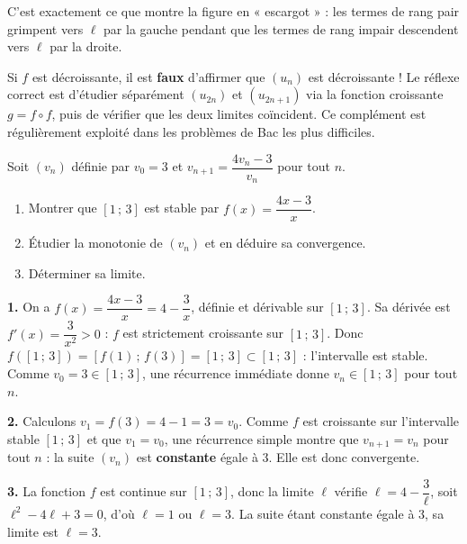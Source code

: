 \documentclass[11pt]{article}
\begin{document}
C'est exactement ce que montre la figure en « escargot » : les termes de rang pair grimpent vers $\ell$ par la gauche pendant que les termes de rang impair descendent vers $\ell$ par la droite.

\begin{attention}
Si $f$ est décroissante, il est \textbf{faux} d'affirmer que $(u_n)$ est décroissante ! Le réflexe correct est d'étudier séparément $(u_{2n})$ et $(u_{2n+1})$ via la fonction croissante $g = f \circ f$, puis de vérifier que les deux limites coïncident. Ce complément est régulièrement exploité dans les problèmes de Bac les plus difficiles.
\end{attention}

\begin{exercice}
Soit $(v_n)$ définie par $v_0 = 3$ et $v_{n+1} = \dfrac{4 v_n - 3}{v_n}$ pour tout $n$.
\begin{enumerate}
\item Montrer que $[1\,;\,3]$ est stable par $f(x) = \dfrac{4x-3}{x}$.
\item Étudier la monotonie de $(v_n)$ et en déduire sa convergence.
\item Déterminer sa limite.
\end{enumerate}
\end{exercice}

\begin{corrige}[Exercice]
\textbf{1.} On a $f(x) = \dfrac{4x-3}{x} = 4 - \dfrac{3}{x}$, définie et dérivable sur $[1\,;\,3]$. Sa dérivée est $f'(x) = \dfrac{3}{x^2} > 0$ : $f$ est strictement croissante sur $[1\,;\,3]$. Donc $f([1\,;\,3]) = [f(1)\,;\,f(3)] = [1\,;\,3] \subset [1\,;\,3]$ : l'intervalle est stable. Comme $v_0 = 3 \in [1\,;\,3]$, une récurrence immédiate donne $v_n \in [1\,;\,3]$ pour tout $n$.

\textbf{2.} Calculons $v_1 = f(3) = 4 - 1 = 3 = v_0$. Comme $f$ est croissante sur l'intervalle stable $[1\,;\,3]$ et que $v_1 = v_0$, une récurrence simple montre que $v_{n+1} = v_n$ pour tout $n$ : la suite $(v_n)$ est \textbf{constante} égale à $3$. Elle est donc convergente.

\textbf{3.} La fonction $f$ est continue sur $[1\,;\,3]$, donc la limite $\ell$ vérifie $\ell = 4 - \dfrac{3}{\ell}$, soit $\ell^2 - 4\ell + 3 = 0$, d'où $\ell = 1$ ou $\ell = 3$. La suite étant constante égale à $3$, sa limite est $\ell = 3$.
\end{corrige}
\end{document}
